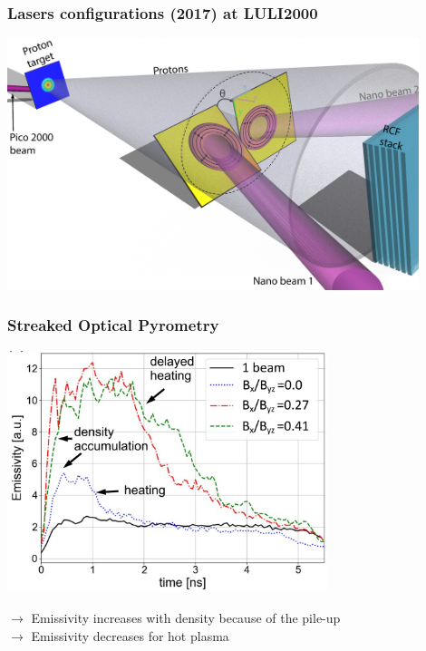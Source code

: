 \documentclass{beamer}
\begin{document}
\begin{frame}
\frametitle{Lasers configurations (2017) at LULI2000}

\begin{center}
\includegraphics[width=0.9\textwidth]{manip.png}
\end{center}

\end{frame}




\begin{frame}
\frametitle{Streaked Optical Pyrometry}

\begin{center}
\includegraphics[width=0.7\textwidth]{SOP.png}
\end{center}

$\rightarrow$ Emissivity increases with density because of the pile-up\\
$\rightarrow$ Emissivity decreases for hot plasma

\end{frame}
\end{document}

